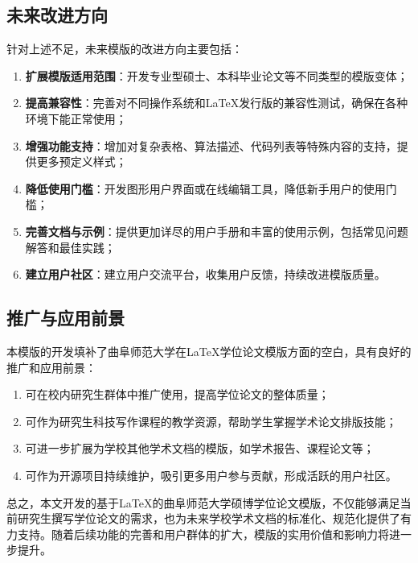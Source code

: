 \subsection{未来改进方向}
针对上述不足，未来模版的改进方向主要包括：

\begin{enumerate}
    \item \textbf{扩展模版适用范围}：开发专业型硕士、本科毕业论文等不同类型的模版变体；
    \item \textbf{提高兼容性}：完善对不同操作系统和\LaTeX{}发行版的兼容性测试，确保在各种环境下能正常使用；
    \item \textbf{增强功能支持}：增加对复杂表格、算法描述、代码列表等特殊内容的支持，提供更多预定义样式；
    \item \textbf{降低使用门槛}：开发图形用户界面或在线编辑工具，降低新手用户的使用门槛；
    \item \textbf{完善文档与示例}：提供更加详尽的用户手册和丰富的使用示例，包括常见问题解答和最佳实践；
    \item \textbf{建立用户社区}：建立用户交流平台，收集用户反馈，持续改进模版质量。
\end{enumerate}

\subsection{推广与应用前景}
本模版的开发填补了曲阜师范大学在\LaTeX{}学位论文模版方面的空白，具有良好的推广和应用前景：

\begin{enumerate}
    \item 可在校内研究生群体中推广使用，提高学位论文的整体质量；
    \item 可作为研究生科技写作课程的教学资源，帮助学生掌握学术论文排版技能；
    \item 可进一步扩展为学校其他学术文档的模版，如学术报告、课程论文等；
    \item 可作为开源项目持续维护，吸引更多用户参与贡献，形成活跃的用户社区。
\end{enumerate}

总之，本文开发的基于\LaTeX{}的曲阜师范大学硕博学位论文模版，不仅能够满足当前研究生撰写学位论文的需求，也为未来学校学术文档的标准化、规范化提供了有力支持。随着后续功能的完善和用户群体的扩大，模版的实用价值和影响力将进一步提升。

